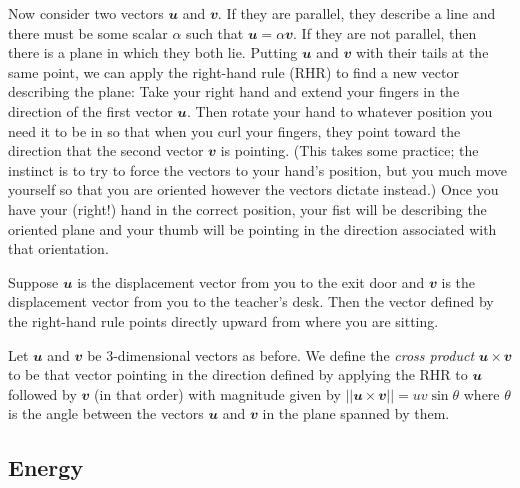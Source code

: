 Now consider two vectors $𝒖$ and $𝒗$. If they are parallel, they describe a line and there must be some scalar $α$ such that $𝒖=α 𝒗$. If they are not parallel, then there is a plane in which they both lie. Putting $𝒖$ and $𝒗$ with their tails at the same point, we can apply the right-hand rule (RHR) to find a new vector describing the plane: Take your right hand and extend your fingers in the direction of the first vector $𝒖$. Then rotate your hand to whatever position you need it to be in so that when you curl your fingers, they point toward the direction that the second vector $𝒗$ is pointing. (This takes some practice; the instinct is to try to force the vectors to your hand's position, but you much move yourself so that you are oriented however the vectors dictate instead.) Once you have your (right!) hand in the correct position, your fist will be describing the oriented plane and your thumb will be pointing in the direction associated with that orientation. 

\begin{example} 
Suppose $𝒖$ is the displacement vector from you to the exit door and $𝒗$ is the displacement vector from you to the teacher's desk. Then the vector defined by the right-hand rule points directly upward from where you are sitting. 
\end{example} 

\begin{definition}
Let $𝒖$ and $𝒗$ be 3-dimensional vectors as before. We define the {\em cross product} $𝒖 × 𝒗$ to be that vector pointing in the direction defined by applying the RHR to $𝒖$ followed by $𝒗$ (in that order) with magnitude given by $||𝒖 × 𝒗|| = u v \sin θ$ where $θ$ is the angle between the vectors $𝒖$ and $𝒗$ in the plane spanned by them.
\end{definition}




\subsection{Energy}


